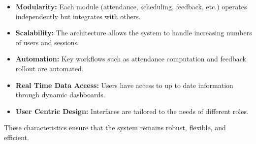 \begin{itemize}
    \item \textbf{Modularity:}
    Each module (attendance, scheduling, feedback, etc.) operates independently but integrates
    with others.

    \item \textbf{Scalability:}
    The architecture allows the system to handle increasing numbers of users and sessions.

    \item \textbf{Automation:}
    Key workflows such as attendance computation and feedback rollout are automated.

    \item \textbf{Real Time Data Access:}
    Users have access to up to date information through dynamic dashboards.

    \item \textbf{User Centric Design:}
    Interfaces are tailored to the needs of different roles.
\end{itemize}

These characteristics ensure that the system remains robust, flexible, and efficient.
